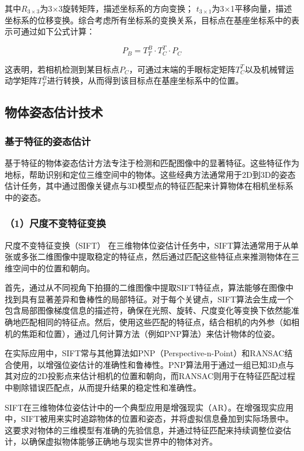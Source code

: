 其中$R_{3 \times 3}$为3$\times$3旋转矩阵，描述坐标系的方向变换； $t_{3 \times 1}$为3$\times$1平移向量，描述坐标系的位移变换。综合考虑所有坐标系的变换关系，目标点在基座坐标系中的表示可通过如下公式计算：

\begin{equation}
	\label{equ:coordinate_base_2}
	P_{B} = T^{B}_{T} \cdot T^{T}_{C} \cdot P_{C}
\end{equation}

这表明，若相机检测到某目标点$P_{C}$，可通过末端的手眼标定矩阵$T^{T}_{C}$以及机械臂运动学矩阵$T^{B}_{T}$进行转换，从而得到该目标点在基座坐标系中的位置。


\subsection{物体姿态估计技术}
\subsubsection{基于特征的姿态估计}
基于特征的物体姿态估计方法专注于检测和匹配图像中的显著特征。这些特征作为地标，帮助识别和定位三维空间中的物体。这些经典方法通常用于2D到3D的姿态估计任务，其中通过图像关键点与3D模型点的特征匹配来计算物体在相机坐标系中的姿态。

 \subsubsection*{（1）尺度不变特征变换}
尺度不变特征变换（SIFT） 在三维物体位姿估计任务中，SIFT算法通常用于从单张或多张二维图像中提取稳定的特征点，然后通过匹配这些特征点来推测物体在三维空间中的位置和朝向。

首先，通过从不同视角下拍摄的二维图像中提取SIFT特征点，算法能够在图像中找到具有显著差异和鲁棒性的局部特征。对于每个关键点，SIFT算法会生成一个包含局部图像梯度信息的描述符，确保在光照、旋转、尺度变化等变换下依然能准确地匹配相同的特征点。然后，使用这些匹配的特征点，结合相机的内外参（如相机的焦距和位置），通过几何计算方法（例如PNP算法）来估计物体的位姿。

在实际应用中，SIFT常与其他算法如PNP（Perspective-n-Point）和RANSAC结合使用，以增强位姿估计的准确性和鲁棒性。PNP算法用于通过一组已知3D点与其对应的2D投影点来估计相机的位置和朝向，而RANSAC则用于在特征匹配过程中剔除错误匹配点，从而提升结果的稳定性和准确性。

SIFT在三维物体位姿估计中的一个典型应用是增强现实（AR）。在增强现实应用中，SIFT被用来实时追踪物体的位置和姿态，并将虚拟信息叠加到实际场景中。这要求对物体的三维模型有准确的先验信息，并通过特征匹配来持续调整位姿估计，以确保虚拟物体能够正确地与现实世界中的物体对齐。

